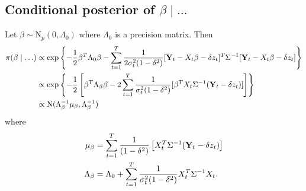 \subsection*{Conditional posterior of $\beta \mid \ldots$}\label{s:betapost}
Let $\beta \sim \mbox{N}_{p}(0, \Lambda_0)$ where $\Lambda_0$ is a precision matrix. Then 
\begin{align*}
    \pi(\beta \mid \ldots) & \propto \exp \left\{ - \frac{ 1 }{ 2 } \beta^T \Lambda_0 \beta - \sum_{t = 1 }^T \frac{ 1 }{ 2 \sigma_t^2 (1 - \delta^2) } [\mbox{\bf Y}_t - X_t \beta - \delta z_t]^T \Sigma^{-1} [\mbox{\bf Y}_t - X_t \beta - \delta z_t] \right\}\\
     & \propto \exp \left\{ -\frac{ 1 }{ 2 } \left[ \beta^T \Lambda_\beta \beta  - 2 \sum_{ t = 1 }^T \frac{ 1 }{ \sigma_t^2 (1 - \delta^2) } [ \beta^T X_t \Sigma^{-1} (\mbox{\bf Y}_t - \delta z_t )] \right] \right\}\\
     & \propto \mbox{N} ( \Lambda_\beta^{-1} \mu_\beta , \Lambda_\beta^{-1})
\end{align*}
where
\begin{align*}
    \mu_\beta &= \sum_{t=1}^{T}\frac{ 1 }{ (1 - \delta^2) } \left[ X_t^T \Sigma^{-1} (\mbox{\bf Y}_t - \delta z_t) \right]\\
    \Lambda_\beta &= \Lambda_0 + \sum_{ t = 1 }^{ T} \frac{ 1 }{ \sigma_t^2 (1 - \delta^2) } X_t^T \Sigma^{-1} X_t. 
\end{align*}

